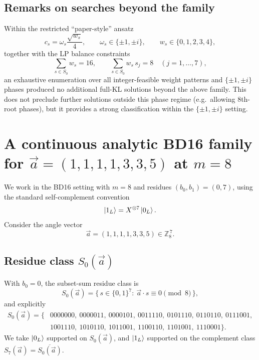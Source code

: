 \documentclass[11pt]{article}
\begin{document}
\subsection{Remarks on searches beyond the family}
Within the restricted ``paper-style'' ansatz
\[
c_s=\omega_s\frac{\sqrt{w_s}}{4},
\qquad
\omega_s\in\{\pm1,\pm i\},
\qquad
w_s\in\{0,1,2,3,4\},
\]
together with the LP balance constraints
\[
\sum_{s\in S_0} w_s=16,\qquad \sum_{s\in S_0} w_s\, s_j = 8\quad (j=1,\dots,7),
\]
an exhaustive enumeration over all integer-feasible weight patterns and \(\{\pm1,\pm i\}\) phases produced no additional full-KL solutions beyond the above family. This does not preclude further solutions outside this phase regime (e.g.\ allowing \(8\)th-root phases), but it provides a strong classification within the \(\{\pm1,\pm i\}\) setting.

\section{A continuous analytic BD16 family for \texorpdfstring{$\vec a=(1,1,1,1,3,3,5)$}{a=(1,1,1,1,3,3,5)} at \texorpdfstring{$m=8$}{m=8}}

We work in the BD16 setting with \(m=8\) and residues \((b_0,b_1)=(0,7)\), using the standard self-complement convention
\[
\ket{1_L}=X^{\otimes 7}\ket{0_L}.
\]
Consider the angle vector
\[
\vec a=(1,1,1,1,3,3,5)\in\mathbb{Z}_8^{\,7}.
\]

\subsection{Residue class \(S_0(\vec a)\)}
With \(b_0=0\), the subset-sum residue class is
\[
S_0(\vec a)=\{\,s\in\{0,1\}^7:\ \vec a\cdot s \equiv 0 \pmod 8\,\},
\]
and explicitly
\[
\begin{aligned}
S_0(\vec a)=\{&
0000000,\ 0000011,\ 0000101,\ 0011110,\ 0101110,\ 0110110,\ 0111001,\\
&1001110,\ 1010110,\ 1011001,\ 1100110,\ 1101001,\ 1110001
\}.
\end{aligned}
\]
We take \(\ket{0_L}\) supported on \(S_0(\vec a)\), and \(\ket{1_L}\) supported on the complement class \(S_7(\vec a)=\overline{S_0(\vec a)}\).
\end{document}
